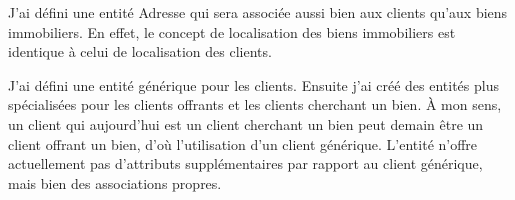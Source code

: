 J'ai défini une entité \og{}Adresse\fg{} qui sera associée aussi bien aux clients qu'aux biens immobiliers. En effet, le concept de localisation des biens immobiliers est identique à celui de localisation des clients.

J'ai défini une entité générique pour les clients. Ensuite j'ai créé des entités plus spécialisées pour les clients offrants et les clients cherchant un bien. À mon sens, un client qui aujourd'hui est un client cherchant un bien peut demain être un client offrant un bien, d'où l'utilisation d'un client générique. L'entité  n'offre actuellement pas d'attributs supplémentaires par rapport au client générique, mais bien des associations propres.